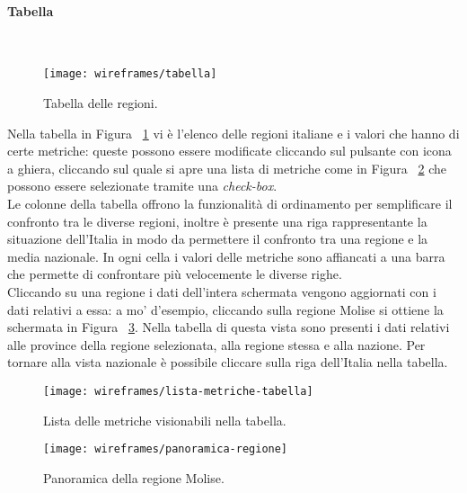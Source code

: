 \documentclass[../../../main.tex]{subfiles}
\begin{document}
\paragraph{Tabella}\mbox{}\\
\begin{figure}[H]
    \centering
    \texttt{[image: wireframes/tabella]}
    \caption{Tabella delle regioni.}
    \label{fig:tabella}
\end{figure}
Nella tabella in Figura ~\ref{fig:tabella} vi è l'elenco delle regioni italiane e i valori che hanno di certe metriche: queste possono essere modificate cliccando sul pulsante con icona a ghiera, cliccando sul quale si apre una lista di metriche come in Figura ~\ref{fig:lista-metriche-tabella} che possono essere selezionate tramite una \textit{check-box}.\\
Le colonne della tabella offrono la funzionalità di ordinamento per semplificare il confronto tra le diverse regioni, inoltre è presente una riga rappresentante la situazione dell'Italia in modo da permettere il confronto tra una regione e la media nazionale. In ogni cella i valori delle metriche sono affiancati a una barra che permette di confrontare più velocemente le diverse righe.\\
Cliccando su una regione i dati dell'intera schermata vengono aggiornati con i dati relativi a essa: a mo' d'esempio, cliccando sulla regione Molise si ottiene la schermata in Figura ~\ref{fig:panoramica-regione}. Nella tabella di questa vista sono presenti i dati relativi alle province della regione selezionata, alla regione stessa e alla nazione. Per tornare alla vista nazionale è possibile cliccare sulla riga dell'Italia nella tabella.
\begin{figure}[H]
    \centering
    \texttt{[image: wireframes/lista-metriche-tabella]}
    \caption{Lista delle metriche visionabili nella tabella.}
    \label{fig:lista-metriche-tabella}
\end{figure}

\begin{figure}[H]
    \centering
    \texttt{[image: wireframes/panoramica-regione]}
    \caption{Panoramica della regione Molise.}
    \label{fig:panoramica-regione}
\end{figure}
\clearpage
\end{document}
